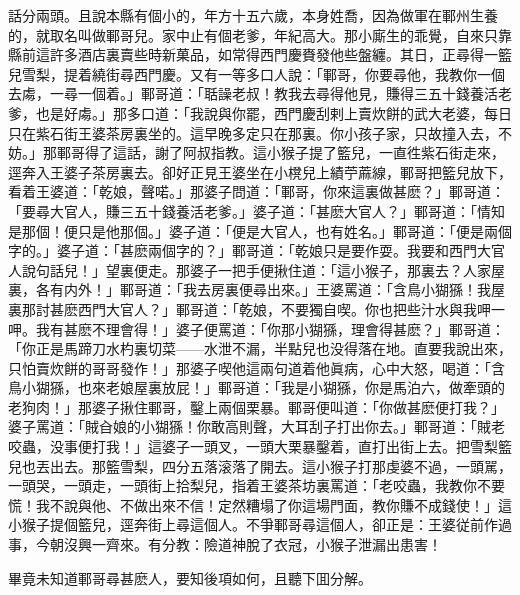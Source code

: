 話分兩頭。且說本縣有個小的，年方十五六歲，本身姓喬，因為做軍在鄆州生養的，就取名叫做鄆哥兒。家中止有個老爹，年紀高大。那小廝生的乖覺，自來只靠縣前這許多酒店裏賣些時新菓品，如常得西門慶賚發他些盤纏。其日，正尋得一籃兒雪梨，提着繞街尋西門慶。又有一等多口人說：「鄆哥，你要尋他，我教你一個去䖏，一尋一個着。」鄆哥道：「聒譟老叔！教我去尋得他見，賺得三五十錢養活老爹，也是好䖏。」那多口道：「我說與你罷，西門慶刮剌上賣炊餅的武大老婆，每日只在紫石街王婆茶房裏坐的。這早晚多定只在那裏。你小孩子家，只故撞入去，不妨。」那鄆哥得了這話，謝了阿叔指教。這小猴子提了籃兒，一直徃紫石街走來，逕奔入王婆子茶房裏去。卻好正見王婆坐在小櫈兒上績苧蔴線，鄆哥把籃兒放下，看着王婆道：「乾娘，聲喏。」那婆子問道：「鄆哥，你來這裏做甚麽？」鄆哥道：「要尋大官人，賺三五十錢養活老爹。」婆子道：「甚麽大官人？」鄆哥道：「情知是那個！便只是他那個。」婆子道：「便是大官人，也有姓名。」鄆哥道：「便是兩個字的。」婆子道：「甚麽兩個字的？」鄆哥道：「乾娘只是要作耍。我要和西門大官人說句話兒！」望裏便走。那婆子一把手便揪住道：「這小猴子，那裏去？人家屋裏，各有内外！」鄆哥道：「我去房裏便尋出來。」王婆罵道：「含鳥小猢猻！我屋裏那討甚麽西門大官人？」鄆哥道：「乾娘，不要獨自喫。你也把些汁水與我呷一呷。我有甚麽不理會得！」婆子便罵道：「你那小猢猻，理會得甚麽？」鄆哥道：「你正是馬蹄刀水杓裏切菜——水泄不漏，半點兒也没得落在地。直要我說出來，只怕賣炊餅的哥哥發作！」那婆子喫他這兩句道着他眞病，心中大怒，喝道：「含鳥小猢猻，也來老娘屋裏放屁！」鄆哥道：「我是小猢猻，你是馬泊六，做牽頭的老狗肉！」那婆子揪住鄆哥，鑿上兩個栗暴。鄆哥便叫道：「你做甚麽便打我？」婆子罵道：「賊㒲娘的小猢猻！你敢高則聲，大耳刮子打出你去。」鄆哥道：「賊老咬蟲，没事便打我！」這婆子一頭叉，一頭大栗暴鑿着，直打出街上去。把雪梨籃兒也丟出去。那籃雪梨，四分五落滚落了開去。這小猴子打那虔婆不過，一頭駡，一頭哭，一頭走，一頭街上拾梨兒，指着王婆茶坊裏罵道：「老咬蟲，我教你不要慌！我不說與他、不做出來不信！定然糟塌了你這場門面，教你賺不成錢使！」這小猴子提個籃兒，逕奔街上尋這個人。不爭鄆哥尋這個人，卻正是：王婆従前作過事，今朝沒興一齊來。有分教：險道神脫了衣冠，小猴子泄漏出患害！

畢竟未知道鄆哥尋甚麽人，要知後項如何，且聽下囬分解。

